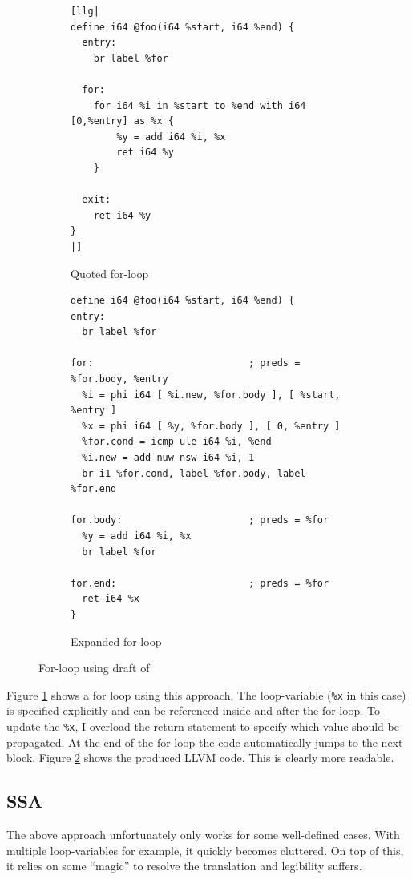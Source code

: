 \documentclass[a4paper,bibliography=totocnumbered,parskip,headsepline]{scrbook}
\begin{document}
\begin{figure}
\begin{subfigure}{\textwidth}
\begin{lstlisting}
[llg|
define i64 @foo(i64 %start, i64 %end) {
  entry:
    br label %for

  for:
    for i64 %i in %start to %end with i64 [0,%entry] as %x {
        %y = add i64 %i, %x
        ret i64 %y
    }

  exit:
    ret i64 %y
}
|]
\end{lstlisting}
\caption{Quoted for-loop}
\label{fig:forquote1}
\end{subfigure}

\begin{subfigure}{\textwidth}
\begin{lstlisting}
define i64 @foo(i64 %start, i64 %end) {
entry:
  br label %for

for:                           ; preds = %for.body, %entry
  %i = phi i64 [ %i.new, %for.body ], [ %start, %entry ]
  %x = phi i64 [ %y, %for.body ], [ 0, %entry ]
  %for.cond = icmp ule i64 %i, %end
  %i.new = add nuw nsw i64 %i, 1
  br i1 %for.cond, label %for.body, label %for.end

for.body:                      ; preds = %for
  %y = add i64 %i, %x
  br label %for

for.end:                       ; preds = %for
  ret i64 %x
}
\end{lstlisting}
\caption{Expanded for-loop}
\label{fig:forquote2}
\end{subfigure}
\caption{For-loop using draft of }
\label{fig:forquote}
\end{figure}

Figure \ref{fig:forquote1} shows a for loop using this approach.
The loop-variable (\lstinline!%x! in this case) is specified explicitly and can be referenced inside and after the for-loop.
To update the \lstinline!%x!, I overload the return statement to specify which value should be propagated.
At the end of the for-loop the code automatically jumps to the next block.
Figure \ref{fig:forquote2} shows the produced LLVM code.
This is clearly more readable.

\subsection{SSA}
The above approach unfortunately only works for some well-defined cases.
With multiple loop-variables for example, it quickly becomes cluttered.
On top of this, it relies on some ``magic'' to resolve the translation and legibility suffers.
\end{document}
